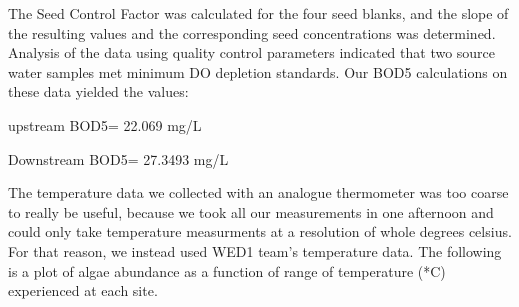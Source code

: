 \documentclass{article}\usepackage[]{graphicx}\usepackage[]{color}
\begin{document}
The Seed Control Factor was calculated for the four seed blanks, and the slope of the resulting values and the corresponding seed concentrations was determined. Analysis of the data using quality control parameters indicated that two source water samples met minimum DO depletion standards. Our BOD5 calculations on these data yielded the values:

upstream BOD5= 22.069 mg/L 

Downstream BOD5= 27.3493 mg/L 

The temperature data we collected with an analogue thermometer was too coarse to really be useful, because we took all our measurements in one afternoon and could only take temperature measurments at a resolution of whole degrees celsius. For that reason, we instead used WED1 team's temperature data. The following is a plot of algae abundance as a function of range of temperature (*C) experienced at each site. 
\end{document}
